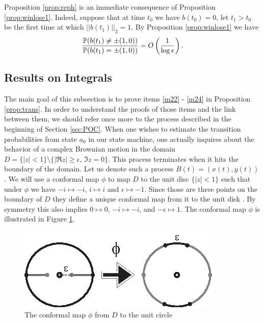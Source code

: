 {{Proposition \ref{prop:reph} is an immediate consequence of Proposition
\ref{prop:winlose1}. Indeed, suppose that at time $t_0$ we have
$b(t_0)=0$, let $t_1>t_0$ be the first time at which $||b(t_1)||_2=1$.
By Proposition \ref{prop:winlose1} we have
$$\frac{\P (b(t_1) \not= \pm(1,0))}{\P (b(t_1) = \pm(1,0))}=O\left(\frac 1 {\log\epsilon}\right).$$
}


\subsection{Results on Integrals}\label{sec:ROI}

The main goal of this subsection is to prove items \ref{m22} - \ref{m24} in Proposition
 \ref{prop:trans}. In order to understand the proofs of those items and the link
  between them, we should refer once more to the process described in the
   beginning of Section \ref{sec:POC}. When one wishes to estimate the
   transition probabilities from state $a_0$ in our state machine, one
   actually inquires about the behavior of a complex Brownian motion in
   the domain $D=\{|z|<1\}\setminus\{|\Re z|\ge\epsilon,\,\Im z=0\}$. This
   process terminates when it hits the boundary of the domain. Let us
   denote such a process $B(t)=(x(t),y(t))$. We will use a conformal
    map $\phi$ to map $D$ to the unit disc $\{|z|<1\}$ such that
    under $\phi$ we have $-i \mapsto-i$, $i\mapsto i$ and
    $\epsilon\mapsto-1$. Since those are three points on the
     boundary of $D$ they define a unique conformal map from it
      to the unit disk . By symmetry
      this also implies $0\mapsto0$, $-i\mapsto -i$, and
       $-\epsilon\mapsto1$. The conformal map $\phi$ is
       illustrated in Figure \ref{fig:conf_map}.
\begin{figure}[htb]
\begin{center}
\leavevmode
\includegraphics{conformal_map.eps}
\end{center}
\caption{The conformal map $\phi$ from $D$ to the unit circle}
\label{fig:conf_map}
\end{figure}

}
